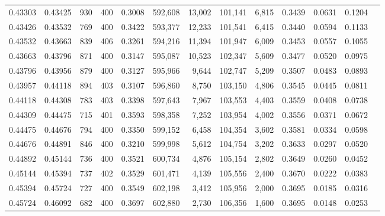 \begin{tabular}{rrrrrrrrrrrrr}
0.43303 & 0.43425 &    930 & 400 &                                     0.3008 & 592,608 &  13,002 & 101,141 &   6,815 & 0.3439 & 0.0631 & 0.1204 \\
0.43426 & 0.43532 &    769 & 400 &                                     0.3422 & 593,377 &  12,233 & 101,541 &   6,415 & 0.3440 & 0.0594 & 0.1133 \\
0.43532 & 0.43663 &    839 & 406 &                                     0.3261 & 594,216 &  11,394 & 101,947 &   6,009 & 0.3453 & 0.0557 & 0.1055 \\
0.43663 & 0.43796 &    871 & 400 &                                     0.3147 & 595,087 &  10,523 & 102,347 &   5,609 & 0.3477 & 0.0520 & 0.0975 \\
0.43796 & 0.43956 &    879 & 400 &                                     0.3127 & 595,966 &   9,644 & 102,747 &   5,209 & 0.3507 & 0.0483 & 0.0893 \\
0.43957 & 0.44118 &    894 & 403 &                                     0.3107 & 596,860 &   8,750 & 103,150 &   4,806 & 0.3545 & 0.0445 & 0.0811 \\
0.44118 & 0.44308 &    783 & 403 &                                     0.3398 & 597,643 &   7,967 & 103,553 &   4,403 & 0.3559 & 0.0408 & 0.0738 \\
0.44309 & 0.44475 &    715 & 401 &                                     0.3593 & 598,358 &   7,252 & 103,954 &   4,002 & 0.3556 & 0.0371 & 0.0672 \\
0.44475 & 0.44676 &    794 & 400 &                                     0.3350 & 599,152 &   6,458 & 104,354 &   3,602 & 0.3581 & 0.0334 & 0.0598 \\
0.44676 & 0.44891 &    846 & 400 &                                     0.3210 & 599,998 &   5,612 & 104,754 &   3,202 & 0.3633 & 0.0297 & 0.0520 \\
0.44892 & 0.45144 &    736 & 400 &                                     0.3521 & 600,734 &   4,876 & 105,154 &   2,802 & 0.3649 & 0.0260 & 0.0452 \\
0.45144 & 0.45394 &    737 & 402 &                                     0.3529 & 601,471 &   4,139 & 105,556 &   2,400 & 0.3670 & 0.0222 & 0.0383 \\
0.45394 & 0.45724 &    727 & 400 &                                     0.3549 & 602,198 &   3,412 & 105,956 &   2,000 & 0.3695 & 0.0185 & 0.0316 \\
0.45724 & 0.46092 &    682 & 400 &                                     0.3697 & 602,880 &   2,730 & 106,356 &   1,600 & 0.3695 & 0.0148 & 0.0253 \\

\end{tabular}
